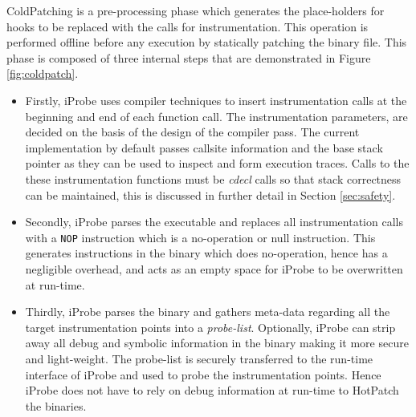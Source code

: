 ColdPatching is a pre-processing phase which generates the place-holders for hooks to be replaced with the calls for instrumentation. 
This operation is performed offline before any execution by statically patching the binary file. 
This phase is composed of three internal steps that are demonstrated in Figure \ref{fig:coldpatch}. 

\begin{itemize}

\item Firstly, iProbe uses compiler techniques to insert instrumentation calls at the beginning and end of each function call. 
The instrumentation parameters, are decided on the basis of the design of the compiler pass. 
The current implementation by default passes callsite information and the base stack pointer as they can be used to inspect and form execution traces. 
Calls to the these instrumentation functions must be \emph{cdecl} calls so that stack correctness can be maintained, this is discussed in further detail in Section \ref{sec:safety}.

\item Secondly, iProbe parses the executable and replaces all instrumentation calls with a \texttt{NOP} instruction which is a no-operation or null instruction. 
This generates instructions in the binary which does no-operation, hence has a negligible overhead, and acts as an empty space for iProbe to be overwritten at run-time.

\item Thirdly, iProbe parses the binary and gathers meta-data regarding all the target instrumentation points into a \emph{probe-list}.
Optionally, iProbe can strip away all debug and symbolic information in the binary making it more secure and light-weight. 
The probe-list is securely transferred to the run-time interface of iProbe and used to probe the instrumentation points. 
Hence iProbe does not have to rely on debug information at run-time to HotPatch the binaries.

\end{itemize}



